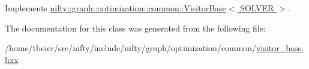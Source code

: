 Implements \hyperlink{classnifty_1_1graph_1_1optimization_1_1common_1_1VisitorBase_aff1cecd18a8436d5e0991fcf32f56400}{nifty\+::graph\+::optimization\+::common\+::\+Visitor\+Base$<$ S\+O\+L\+V\+E\+R $>$}.



The documentation for this class was generated from the following file\+:\begin{DoxyCompactItemize}
\item 
/home/tbeier/src/nifty/include/nifty/graph/optimization/common/\hyperlink{visitor__base_8hxx}{visitor\+\_\+base.\+hxx}\end{DoxyCompactItemize}
